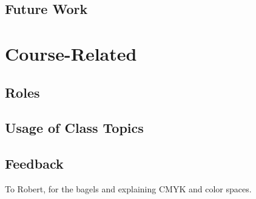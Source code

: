 \documentclass[acmlarge,11pt]{acmart}
\begin{document}
\subsection{Future Work}

\section{Course-Related}

\subsection{Roles}

\subsection{Usage of Class Topics}

\subsection{Feedback}

\begin{acks}
To Robert, for the bagels and explaining CMYK and color spaces.
\end{acks}



\end{document}

